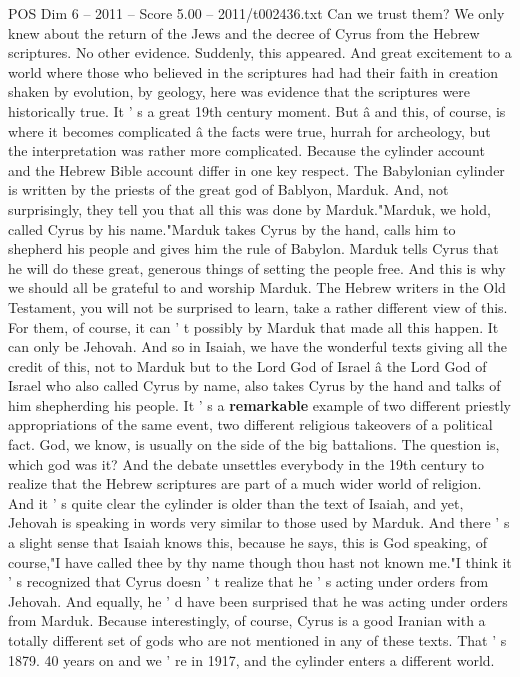 \begin{textsample}{POS Dim 6 – 2011 – Score 5.00 – 2011/t002436.txt}
Can we trust them?
We only knew about the return of the Jews and the decree of Cyrus from the Hebrew scriptures.
No other evidence.
Suddenly, this appeared.
And great excitement to a world where those who believed in the scriptures had had their faith in creation shaken by evolution, by geology, here was evidence that the scriptures were historically true.
It ' s a great 19th century moment.
But â and this, of course, is where it becomes complicated â the facts were true, hurrah for archeology, but the interpretation was rather more complicated.
Because the cylinder account and the Hebrew Bible account differ in one key respect.
The Babylonian cylinder is written by the priests of the great god of Bablyon, Marduk.
And, not surprisingly, they tell you that all this was done by Marduk."Marduk, we hold, called Cyrus by his name."Marduk takes Cyrus by the hand, calls him to shepherd his people and gives him the rule of Babylon.
Marduk tells Cyrus that he will do these great, generous things of setting the people free.
And this is why we should all be grateful to and worship Marduk.
The Hebrew writers in the Old Testament, you will not be surprised to learn, take a rather different view of this.
For them, of course, it can ' t possibly by Marduk that made all this happen.
It can only be Jehovah.
And so in Isaiah, we have the wonderful texts giving all the credit of this, not to Marduk but to the Lord God of Israel â the Lord God of Israel who also called Cyrus by name, also takes Cyrus by the hand and talks of him shepherding his people.
It ' s a \textbf{remarkable} example of two different priestly appropriations of the same event, two different religious takeovers of a political fact.
God, we know, is usually on the side of the big battalions.
The question is, which god was it?
And the debate unsettles everybody in the 19th century to realize that the Hebrew scriptures are part of a much wider world of religion.
And it ' s quite clear the cylinder is older than the text of Isaiah, and yet, Jehovah is speaking in words very similar to those used by Marduk.
And there ' s a slight sense that Isaiah knows this, because he says, this is God speaking, of course,"I have called thee by thy name though thou hast not known me."I think it ' s recognized that Cyrus doesn ' t realize that he ' s acting under orders from Jehovah.
And equally, he ' d have been surprised that he was acting under orders from Marduk.
Because interestingly, of course, Cyrus is a good Iranian with a totally different set of gods who are not mentioned in any of these texts.
That ' s 1879. 40 years on and we ' re in 1917, and the cylinder enters a different world.

\end{textsample}
